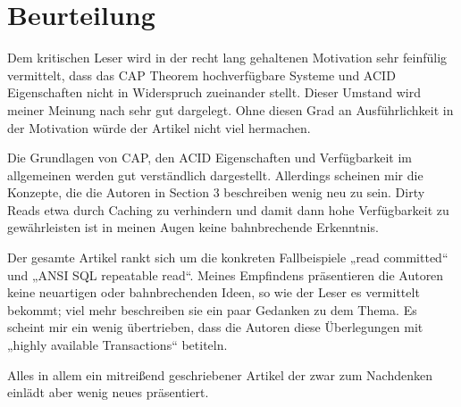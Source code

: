 \section{Beurteilung}

Dem kritischen Leser wird in der recht lang gehaltenen Motivation sehr feinfülig vermittelt, dass das CAP Theorem hochverfügbare Systeme und ACID Eigenschaften nicht in Widerspruch zueinander stellt. Dieser Umstand wird meiner Meinung nach sehr gut dargelegt. Ohne diesen Grad an Ausführlichkeit in der Motivation würde der Artikel nicht viel hermachen.

Die Grundlagen von CAP, den ACID Eigenschaften und Verfügbarkeit im allgemeinen werden gut verständlich dargestellt. Allerdings scheinen mir die Konzepte, die die Autoren in Section 3 beschreiben wenig neu zu sein. Dirty Reads etwa durch Caching zu verhindern und damit dann hohe Verfügbarkeit zu gewährleisten ist in meinen Augen keine bahnbrechende Erkenntnis. 

Der gesamte Artikel rankt sich um die konkreten Fallbeispiele „read committed“ und „ANSI SQL repeatable read“. Meines Empfindens präsentieren die Autoren keine neuartigen oder bahnbrechenden Ideen, so wie der Leser es vermittelt bekommt; viel mehr beschreiben sie ein paar Gedanken zu dem Thema. Es scheint mir ein wenig übertrieben, dass die Autoren diese Überlegungen mit „highly available Transactions“ betiteln.

Alles in allem ein mitreißend geschriebener Artikel der zwar zum Nachdenken einlädt aber wenig neues präsentiert.